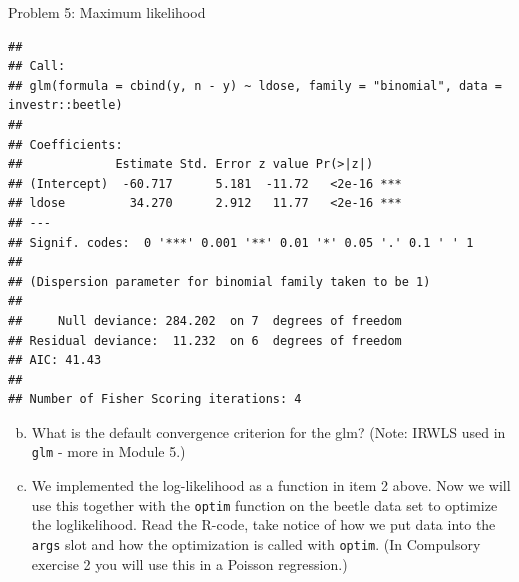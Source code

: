 \documentclass[
  ignorenonframetext,
]{beamer}
\newenvironment{Shaded}{\begin{snugshade}}{\end{snugshade}}
\newcommand{\ControlFlowTok}[1]{\textcolor[rgb]{0.13,0.29,0.53}{\textbf{#1}}}
\newcommand{\DecValTok}[1]{\textcolor[rgb]{0.00,0.00,0.81}{#1}}
\newcommand{\FunctionTok}[1]{\textcolor[rgb]{0.13,0.29,0.53}{\textbf{#1}}}
\newcommand{\NormalTok}[1]{#1}
\newcommand{\OtherTok}[1]{\textcolor[rgb]{0.56,0.35,0.01}{#1}}
\newcommand{\SpecialCharTok}[1]{\textcolor[rgb]{0.81,0.36,0.00}{\textbf{#1}}}
\begin{document}
\begin{frame}[fragile]
\begin{block}{Problem 5: Maximum likelihood}
\begin{verbatim}
## 
## Call:
## glm(formula = cbind(y, n - y) ~ ldose, family = "binomial", data = investr::beetle)
## 
## Coefficients:
##             Estimate Std. Error z value Pr(>|z|)    
## (Intercept)  -60.717      5.181  -11.72   <2e-16 ***
## ldose         34.270      2.912   11.77   <2e-16 ***
## ---
## Signif. codes:  0 '***' 0.001 '**' 0.01 '*' 0.05 '.' 0.1 ' ' 1
## 
## (Dispersion parameter for binomial family taken to be 1)
## 
##     Null deviance: 284.202  on 7  degrees of freedom
## Residual deviance:  11.232  on 6  degrees of freedom
## AIC: 41.43
## 
## Number of Fisher Scoring iterations: 4
\end{verbatim}

\begin{enumerate}
[a)]
\setcounter{enumi}{1}
\item
  What is the default convergence criterion for the glm? (Note: IRWLS
  used in \texttt{glm} - more in Module 5.)
\item
  We implemented the log-likelihood as a function in item 2 above. Now
  we will use this together with the \texttt{optim} function on the
  beetle data set to optimize the loglikelihood. Read the R-code, take
  notice of how we put data into the \texttt{args} slot and how the
  optimization is called with \texttt{optim}. (In Compulsory exercise 2
  you will use this in a Poisson regression.)
\end{enumerate}

\begin{Shaded}
\end{Shaded}
\end{block}
\end{frame}
\end{document}
